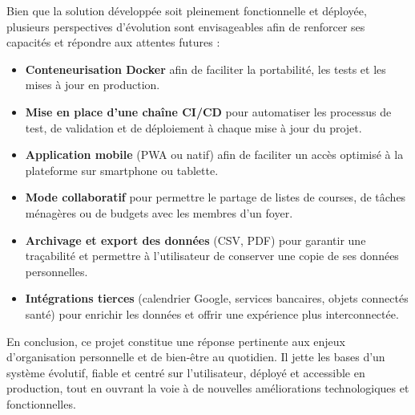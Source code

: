 Bien que la solution développée soit pleinement fonctionnelle et déployée, plusieurs perspectives d'évolution sont envisageables afin de renforcer ses capacités et répondre aux attentes futures :

\begin{itemize}
\item \textbf{Conteneurisation Docker} afin de faciliter la portabilité, les tests et les mises à jour en production.
\item \textbf{Mise en place d'une chaîne CI/CD} pour automatiser les processus de test, de validation et de déploiement à chaque mise à jour du projet.
\item \textbf{Application mobile} (PWA ou natif) afin de faciliter un accès optimisé à la plateforme sur smartphone ou tablette.
\item \textbf{Mode collaboratif} pour permettre le partage de listes de courses, de tâches ménagères ou de budgets avec les membres d'un foyer.
\item \textbf{Archivage et export des données} (CSV, PDF) pour garantir une traçabilité et permettre à l'utilisateur de conserver une copie de ses données personnelles.
\item \textbf{Intégrations tierces} (calendrier Google, services bancaires, objets connectés santé) pour enrichir les données et offrir une expérience plus interconnectée.
\end{itemize}

En conclusion, ce projet constitue une réponse pertinente aux enjeux d'organisation personnelle et de bien-être au quotidien. Il jette les bases d'un système évolutif, fiable et centré sur l'utilisateur, déployé et accessible en production, tout en ouvrant la voie à de nouvelles améliorations technologiques et fonctionnelles.
